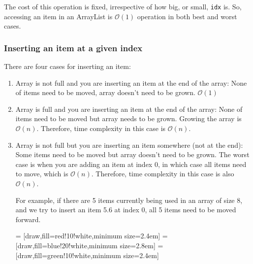 The cost of this operation is fixed, irrespective of how big, or small, \texttt{idx} is. So, accessing an item in an ArrayList is $\mathcal{O}(1)$ operation in both best and worst cases.

\subsubsection{Inserting an item at a given index}

There are four cases for inserting an item:

\begin{enumerate}

\item Array is not full and you are inserting an item at the end of the array: None of items need to be moved, array doesn't need to be grown. $\mathcal{O}(1)$
\item Array is full and you are inserting an item at the end of the array: None of items need to be moved but array needs to be grown. Growing the array is $\mathcal{O}(n)$. Therefore, time complexity in this case is $\mathcal{O}(n)$.
\item Array is not full but you are inserting an item somewhere (not at the end): Some items need to be moved but array doesn't need to be grown. The worst case is when you are adding an item at index 0, in which case all items need to move, which is $\mathcal{O}(n)$. Therefore, time complexity in this case is also $\mathcal{O}(n)$.

For example, if there are 5 items currently being used in an array of size 8, and we try to insert an item 5.6 at index 0, all 5 items need to be moved forward.


 = [draw,fill=red!10!white,minimum size=2.4em]
 = [draw,fill=blue!20!white,minimum size=2.8em]
 = [draw,fill=green!10!white,minimum size=2.4em]

\newcommand{\data}{{{12.5, 6.4, 8.5, 9.6, -3.4, 0, 0, 0},
					{12.5, 6.4, 8.5, 9.6, -3.4, -3.4, 0, 0},
					{12.5, 6.4, 8.5, 9.6, 9.6, -3.4, 0, 0},
					{12.5, 6.4, 8.5, 8.5, 9.6, -3.4, 0, 0},
					{12.5, 6.4, 6.4, 8.5, 9.6, -3.4, 0, 0},
					{12.5, 12.5, 6.4, 8.5, 9.6, -3.4, 0, 0},
					{6.4, 12.5, 6.4, 8.5, 9.6, -3.4, 0, 0}}}
					

\end{enumerate}
